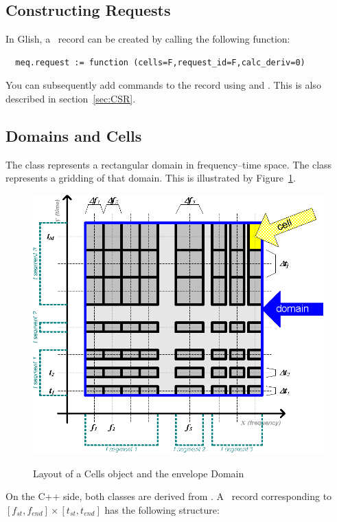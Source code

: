 \documentclass[10pt,twoside]{book}
\begin{document}
\subsection{Constructing Requests}
  
  In Glish, a \Request\ record can be created by calling the following
  function:

  \begin{verbatim}
  meq.request := function (cells=F,request_id=F,calc_deriv=0)
  \end{verbatim}
  
  You can subsequently add commands to the record using 
  and . This is also described in section~\ref{sec:CSR}.
  
\subsection{Domains and Cells}

  The  class represents a rectangular domain in frequency--time
  space. The  class represents a gridding of that domain. This is
  illustrated by Figure~\ref{fig:cells}.
  
  \begin{figure}
  \begin{centering}
  \includegraphics[width=.5\textwidth]{Figures/Cells.eps}\\
  \end{centering}
  \caption{\label{fig:cells}Layout of a Cells object and the envelope Domain}
  \end{figure}
  
  On the C++ side, both classes are derived from . A \Domain\ 
  record corresponding to $[f_{st},f_{end}]\times[t_{st},t_{end}]$ has the following structure:
  
  \qq{[ freq = [ $f_{st},f_{end}$ ], time = [ $t_{st},t_{end}$ ] ]}
  
\end{document}

